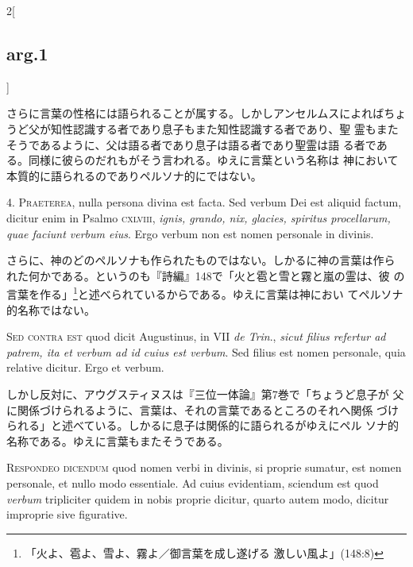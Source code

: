 \documentclass[paper=a4paper,fontsize=10pt,jafontsize=9pt,titlepage]{jlreq}
\begin{document}
\begin{paracol}{2}[\subsection{arg.1}]
\switchcolumn

さらに言葉の性格には語られることが属する。しかしアンセルムスによればちょ
 うど父が知性認識する者であり息子もまた知性認識する者であり、聖
 霊もまたそうであるように、父は語る者であり息子は語る者であり聖霊は語
 る者である。同様に彼らのだれもがそう言われる。ゆえに言葉という名称は
 神において本質的に語られるのでありペルソナ的にではない。


4. {\scshape Praeterea}, nulla persona divina est facta. Sed verbum Dei est aliquid
 factum, dicitur enim in Psalmo {\scshape cxlviii}, {\itshape ignis, grando, nix, glacies,
 spiritus procellarum, quae faciunt verbum eius}. Ergo verbum non est
 nomen personale in divinis.

\switchcolumn

さらに、神のどのペルソナも作られたものではない。しかるに神の言葉は作ら
 れた何かである。というのも『詩編』148で「火と雹と雪と霧と嵐の霊は、彼
 の言葉を作る」\footnote{「火よ、雹よ、雪よ、霧よ／御言葉を成し遂げる
 激しい風よ」(148:8)}と述べられているからである。ゆえに言葉は神におい
 てペルソナ的名称ではない。

\switchcolumn*[\subsection{s.c.}]

{\scshape Sed contra est} quod dicit Augustinus, in VII {\itshape de Trin}., {\itshape sicut filius
 refertur ad patrem, ita et verbum ad id cuius est verbum}. Sed filius
 est nomen personale, quia relative dicitur. Ergo et verbum.

\switchcolumn

しかし反対に、アウグスティヌスは『三位一体論』第7巻で「ちょうど息子が
 父に関係づけられるように、言葉は、それの言葉であるところのそれへ関係
 づけられる」と述べている。しかるに息子は関係的に語られるがゆえにペル
 ソナ的名称である。ゆえに言葉もまたそうである。


{\scshape Respondeo dicendum} quod nomen verbi in divinis, si proprie sumatur,
 est nomen personale, et nullo modo essentiale. Ad cuius evidentiam,
 sciendum est quod {\itshape verbum} tripliciter quidem in nobis proprie dicitur,
 quarto autem modo, dicitur improprie sive figurative.


\end{paracol}
\end{document}
